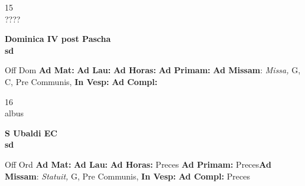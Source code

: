 \documentclass[10pt, openany]{book}
\begin{document}
    \begin{center}
        \begin{minipage}{3.5in}
            \vspace{2em}
            \begin{minipage}{0.5in}
                {\Huge 15} \\
                {\normalsize ????}
            \end{minipage}
            \begin{minipage}{3.0in}
                \textbf{ \large Dominica IV post Pascha \\
                \textnormal{\normalsize sd}}

            \end{minipage}
            \begin{justify}Off Dom
                \textbf{Ad Mat: }
                \textbf{Ad Lau: }
                \textbf{Ad Horas: }
                \textbf{Ad Primam: }\textbf{Ad Missam}: \textit{Missa,} G, C, Pre Communis, 
                \textbf{In Vesp: }
                \textbf{Ad Compl: }
            \end{justify}
        \end{minipage}
    \end{center}

    \begin{center}
        \begin{minipage}{3.5in}
            \vspace{2em}
            \begin{minipage}{0.5in}
                {\Huge 16} \\
                {\normalsize albus}
            \end{minipage}
            \begin{minipage}{3.0in}
                \textbf{ \large S Ubaldi EC \\
                \textnormal{\normalsize sd}}

            \end{minipage}
            \begin{justify}Off Ord
                \textbf{Ad Mat: }
                \textbf{Ad Lau: }
                \textbf{Ad Horas: }Preces
                \textbf{Ad Primam: }Preces\textbf{Ad Missam}: \textit{Statuit,} G, Pre Communis, 
                \textbf{In Vesp: }
                \textbf{Ad Compl: }Preces
            \end{justify}
        \end{minipage}
    \end{center}
\end{document}
